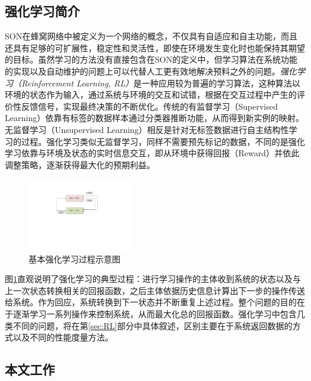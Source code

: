 \documentclass{IEEEtran}
\begin{document}
\subsection{强化学习简介}


SON在蜂窝网络中被定义为一个网络的概念，不仅具有自适应和自主功能，而且还具有足够的可扩展性，稳定性和灵活性，即使在环境发生变化时也能保持其期望的目标。虽然学习的方法没有直接包含在SON的定义中，但学习算法在系统功能的实现以及自动维护的问题上可以代替人工更有效地解决预料之外的问题。\emph{强化学习（Reinforcement Learning, RL）}是一种应用较为普遍的学习算法，这种算法以环境的状态作为输入，通过系统与环境的交互和试错，根据在交互过程中产生的评价性反馈信号，实现最终决策的不断优化。传统的有监督学习（Supervised Learning）依靠有标签的数据样本通过分类器推断功能，从而得到新实例的映射。无监督学习（Unsupervised Learning）相反是针对无标签数据进行自主结构性学习的过程。强化学习类似无监督学习，同样不需要预先标记的数据，不同的是强化学习依靠与环境及状态的实时信息交互，即从环境中获得回报（Reward）并依此调整策略，逐渐获得最大化的预期利益。
\begin{figure}%
\centerline{\includegraphics[width=0.4\textwidth]{reinforcement.pdf}}
\caption{基本强化学习过程示意图}
\label{fig:rein}
\end{figure}
图\ref{fig:rein}直观说明了强化学习的典型过程：进行学习操作的主体收到系统的状态以及与上一次状态转换相关的回报函数，之后主体依据历史信息计算出下一步的操作传送给系统。作为回应，系统转换到下一状态并不断重复上述过程。整个问题的目的在于逐渐学习一系列操作来控制系统，从而最大化总的回报函数。强化学习中包含几类不同的问题，将在第\ref{sec:RL}部分中具体叙述，区别主要在于系统返回数据的方式以及不同的性能度量方法。


\subsection{本文工作}
\end{document}
